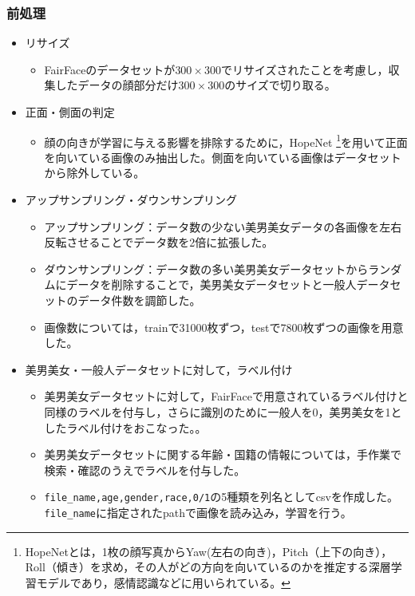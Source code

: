 \documentclass[a4paper,11pt,titlepage]{jsarticle}
\begin{document}
\subsubsection{前処理}
\begin{itemize}
    \item リサイズ
        \begin{itemize}
            \item FairFaceのデータセットが$300 \times 300$でリサイズされたことを考慮し，収集したデータの顔部分だけ$300 \times 300$のサイズで切り取る。
        \end{itemize}
    \item 正面・側面の判定
        \begin{itemize}
            \item 顔の向きが学習に与える影響を排除するために，HopeNet \footnote{ HopeNetとは，1枚の顔写真からYaw(左右の向き)，Pitch（上下の向き），Roll（傾き）を求め，その人がどの方向を向いているのかを推定する深層学習モデルであり，感情認識などに用いられている。\cite{hopenet_paper}\cite{hopenet} }を用いて正面を向いている画像のみ抽出した。側面を向いている画像はデータセットから除外している。
        \end{itemize}
    \item アップサンプリング・ダウンサンプリング
        \begin{itemize}
            \item アップサンプリング：データ数の少ない美男美女データの各画像を左右反転させることでデータ数を2倍に拡張した。
            \item ダウンサンプリング：データ数の多い美男美女データセットからランダムにデータを削除することで，美男美女データセットと一般人データセットのデータ件数を調節した。
            \item 画像数については，trainで31000枚ずつ，testで7800枚ずつの画像を用意した。
        \end{itemize}
    \item 美男美女・一般人データセットに対して，ラベル付け
        \begin{itemize}
            \item 美男美女データセットに対して，FairFaceで用意されているラベル付けと同様のラベルを付与し，さらに識別のために一般人を0，美男美女を1としたラベル付けをおこなった。。
            \item 美男美女データセットに関する年齢・国籍の情報については，手作業で検索・確認のうえでラベルを付与した。
            \item \texttt{file\_name,age,gender,race,0/1}の5種類を列名としてcsvを作成した。\texttt{file\_name}に指定されたpathで画像を読み込み，学習を行う。
        \end{itemize}
\end{itemize}
\end{document}
